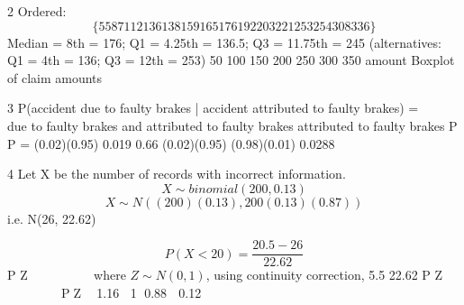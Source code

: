 \documentclass[a4paper,12pt]{article}
\begin{document}
2 Ordered: 
\[\{55 87 112 136 138 159 165 176 192 203 221 253 254 308 336\}\]
Median = 8th = 176; Q1 = 4.25th = 136.5; Q3 = 11.75th = 245
(alternatives: Q1 = 4th = 136; Q3 = 12th = 253)
50 100 150 200 250 300 350
amount
Boxplot of claim amounts

3 P(accident due to faulty brakes | accident attributed to faulty brakes)
=  
 
due to faulty brakes and attributed to faulty brakes
attributed to faulty brakes
P
P
= (0.02)(0.95) 0.019 0.66
(0.02)(0.95) (0.98)(0.01) 0.0288
 


4 Let X be the number of records with incorrect information.
\[X \sim binomial(200, 0.13)\]
\[X \sim  N((200)(0.13), 200(0.13)(0.87)) \]
i.e. N(26, 22.62)

\[ P(X < 20) = \frac{20.5 - 26}{22.62}\]
P Z
  
   
 	
where $Z \sim N(0,1)$, using continuity correction,
5.5
22.62
P Z
  
   
 	
 PZ  1.16 1 0.88  0.12
\end{document}
